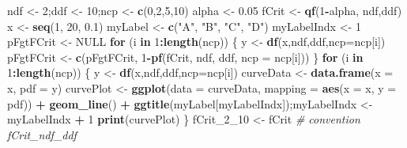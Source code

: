 \documentclass[
]{book}
\newenvironment{Shaded}{\begin{snugshade}}{\end{snugshade}}
\newcommand{\CommentTok}[1]{\textcolor[rgb]{0.56,0.35,0.01}{\textit{#1}}}
\newcommand{\ControlFlowTok}[1]{\textcolor[rgb]{0.13,0.29,0.53}{\textbf{#1}}}
\newcommand{\DataTypeTok}[1]{\textcolor[rgb]{0.13,0.29,0.53}{#1}}
\newcommand{\DecValTok}[1]{\textcolor[rgb]{0.00,0.00,0.81}{#1}}
\newcommand{\FloatTok}[1]{\textcolor[rgb]{0.00,0.00,0.81}{#1}}
\newcommand{\KeywordTok}[1]{\textcolor[rgb]{0.13,0.29,0.53}{\textbf{#1}}}
\newcommand{\NormalTok}[1]{#1}
\newcommand{\OperatorTok}[1]{\textcolor[rgb]{0.81,0.36,0.00}{\textbf{#1}}}
\newcommand{\OtherTok}[1]{\textcolor[rgb]{0.56,0.35,0.01}{#1}}
\newcommand{\StringTok}[1]{\textcolor[rgb]{0.31,0.60,0.02}{#1}}
\begin{document}
\begin{Shaded}
\begin{Highlighting}[]
\NormalTok{ndf \textless{}{-}}\StringTok{ }\DecValTok{2}\NormalTok{;ddf \textless{}{-}}\StringTok{ }\DecValTok{10}\NormalTok{;ncp \textless{}{-}}\StringTok{ }\KeywordTok{c}\NormalTok{(}\DecValTok{0}\NormalTok{,}\DecValTok{2}\NormalTok{,}\DecValTok{5}\NormalTok{,}\DecValTok{10}\NormalTok{)}
\NormalTok{alpha \textless{}{-}}\StringTok{ }\FloatTok{0.05}
\NormalTok{fCrit \textless{}{-}}\StringTok{ }\KeywordTok{qf}\NormalTok{(}\DecValTok{1}\OperatorTok{{-}}\NormalTok{alpha, ndf,ddf)}
\NormalTok{x \textless{}{-}}\StringTok{ }\KeywordTok{seq}\NormalTok{(}\DecValTok{1}\NormalTok{, }\DecValTok{20}\NormalTok{, }\FloatTok{0.1}\NormalTok{)}
\NormalTok{myLabel \textless{}{-}}\StringTok{ }\KeywordTok{c}\NormalTok{(}\StringTok{"A"}\NormalTok{, }\StringTok{"B"}\NormalTok{, }\StringTok{"C"}\NormalTok{, }\StringTok{"D"}\NormalTok{)}
\NormalTok{myLabelIndx \textless{}{-}}\StringTok{ }\DecValTok{1}
\NormalTok{pFgtFCrit \textless{}{-}}\StringTok{ }\OtherTok{NULL}
\ControlFlowTok{for}\NormalTok{ (i }\ControlFlowTok{in} \DecValTok{1}\OperatorTok{:}\KeywordTok{length}\NormalTok{(ncp))}
\NormalTok{\{}
\NormalTok{  y \textless{}{-}}\StringTok{ }\KeywordTok{df}\NormalTok{(x,ndf,ddf,}\DataTypeTok{ncp=}\NormalTok{ncp[i])}
\NormalTok{  pFgtFCrit \textless{}{-}}\StringTok{ }\KeywordTok{c}\NormalTok{(pFgtFCrit, }\DecValTok{1}\OperatorTok{{-}}\KeywordTok{pf}\NormalTok{(fCrit, ndf, ddf, }\DataTypeTok{ncp =}\NormalTok{ ncp[i]))}
\NormalTok{\}  }
\ControlFlowTok{for}\NormalTok{ (i }\ControlFlowTok{in} \DecValTok{1}\OperatorTok{:}\KeywordTok{length}\NormalTok{(ncp))}
\NormalTok{\{}
\NormalTok{  y \textless{}{-}}\StringTok{ }\KeywordTok{df}\NormalTok{(x,ndf,ddf,}\DataTypeTok{ncp=}\NormalTok{ncp[i])}
\NormalTok{  curveData \textless{}{-}}\StringTok{ }\KeywordTok{data.frame}\NormalTok{(}\DataTypeTok{x =}\NormalTok{ x, }\DataTypeTok{pdf =}\NormalTok{ y)}
\NormalTok{  curvePlot \textless{}{-}}\StringTok{ }\KeywordTok{ggplot}\NormalTok{(}\DataTypeTok{data =}\NormalTok{ curveData, }\DataTypeTok{mapping =} \KeywordTok{aes}\NormalTok{(}\DataTypeTok{x =}\NormalTok{ x, }\DataTypeTok{y =}\NormalTok{ pdf)) }\OperatorTok{+}\StringTok{ }
\StringTok{    }\KeywordTok{geom\_line}\NormalTok{() }\OperatorTok{+}
\StringTok{    }\KeywordTok{ggtitle}\NormalTok{(myLabel[myLabelIndx]);myLabelIndx \textless{}{-}}\StringTok{ }\NormalTok{myLabelIndx }\OperatorTok{+}\StringTok{ }\DecValTok{1}
  \KeywordTok{print}\NormalTok{(curvePlot)}
\NormalTok{\}}
\NormalTok{fCrit\_}\DecValTok{2}\NormalTok{\_}\DecValTok{10}\NormalTok{ \textless{}{-}}\StringTok{ }\NormalTok{fCrit }\CommentTok{\# convention fCrit\_ndf\_ddf}
\end{Highlighting}
\end{Shaded}
\end{document}
